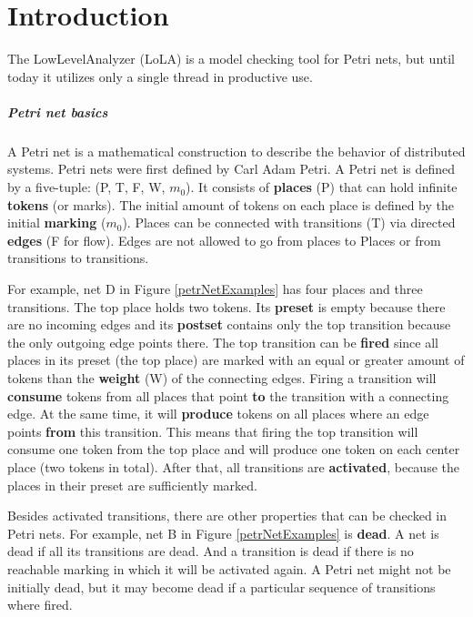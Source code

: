 \chapter{Introduction}
\label{introduction}

The LowLevelAnalyzer (LoLA) is a model checking tool for Petri nets, but until today it utilizes only a single thread in productive use.

\paragraph*{Petri net basics}
A Petri net is a mathematical construction to describe the behavior of distributed systems. Petri nets were first defined by Carl Adam Petri\cite{Petri1962kommunikation}. A Petri net is defined by a five-tuple: (P, T, F, W, $m_0$). It consists of \textbf{places} (P) that can hold infinite \textbf{tokens} (or marks). The initial amount of tokens on each place is defined by the initial \textbf{marking} ($m_0$). Places can be connected with transitions (T) via directed \textbf{edges} (F for flow). Edges are not allowed to go from places to Places or from transitions to transitions.

For example, net D in Figure \ref{petrNetExamples} has four places and three transitions. The top place holds two tokens. Its \textbf{preset} is empty because there are no incoming edges and its \textbf{postset} contains only the top transition because the only outgoing edge points there. The top transition can be \textbf{fired} since all places in its preset (the top place) are marked with an equal or greater amount of tokens than the \textbf{weight} (W) of the connecting edges. Firing a transition will \textbf{consume} tokens from all places that point \textbf{to} the transition with a connecting edge. At the same time, it will \textbf{produce} tokens on all places where an edge points \textbf{from} this transition. This means that firing the top transition will consume one token from the top place and will produce one token on each center place (two tokens in total). After that, all transitions are \textbf{activated}, because the places in their preset are sufficiently marked.

Besides activated transitions, there are other properties\cite{murata1989petri} that can be checked in Petri nets. For example, net B in Figure \ref{petrNetExamples} is \textbf{dead}. A net is dead if all its transitions are dead. And a transition is dead if there is no reachable marking in which it will be activated again. A Petri net might not be initially dead, but it may become dead if a particular sequence of transitions where fired.

